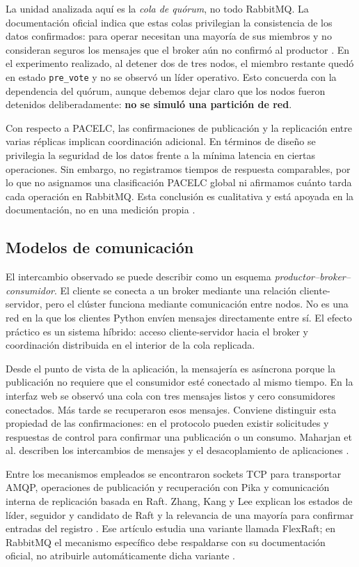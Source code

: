 \documentclass[12pt,a4paper]{article}
\begin{document}
La unidad analizada aquí es la \emph{cola de quórum}, no todo RabbitMQ. La documentación oficial indica que estas colas privilegian la consistencia de los datos confirmados: para operar necesitan una mayoría de sus miembros y no consideran seguros los mensajes que el broker aún no confirmó al productor \cite{RabbitMQQuorum2026}. En el experimento realizado, al detener dos de tres nodos, el miembro restante quedó en estado \texttt{pre\_vote} y no se observó un líder operativo. Esto concuerda con la dependencia del quórum, aunque debemos dejar claro que los nodos fueron detenidos deliberadamente: \textbf{no se simuló una partición de red}.

Con respecto a PACELC, las confirmaciones de publicación y la replicación entre varias réplicas implican coordinación adicional. En términos de diseño se privilegia la seguridad de los datos frente a la mínima latencia en ciertas operaciones. Sin embargo, no registramos tiempos de respuesta comparables, por lo que no asignamos una clasificación PACELC global ni afirmamos cuánto tarda cada operación en RabbitMQ. Esta conclusión es cualitativa y está apoyada en la documentación, no en una medición propia \cite{RabbitMQQuorum2026, Ahmed2023}.

\subsection{Modelos de comunicación}
El intercambio observado se puede describir como un esquema \emph{productor--broker--consumidor}. El cliente se conecta a un broker mediante una relación cliente-servidor, pero el clúster funciona mediante comunicación entre nodos. No es una red en la que los clientes Python envíen mensajes directamente entre sí. El efecto práctico es un sistema híbrido: acceso cliente-servidor hacia el broker y coordinación distribuida en el interior de la cola replicada.

Desde el punto de vista de la aplicación, la mensajería es asíncrona porque la publicación no requiere que el consumidor esté conectado al mismo tiempo. En la interfaz web se observó una cola con tres mensajes listos y cero consumidores conectados. Más tarde se recuperaron esos mensajes. Conviene distinguir esta propiedad de las confirmaciones: en el protocolo pueden existir solicitudes y respuestas de control para confirmar una publicación o un consumo. Maharjan et al. describen los intercambios de mensajes y el desacoplamiento de aplicaciones \cite{Maharjan2023}.

Entre los mecanismos empleados se encontraron sockets TCP para transportar AMQP, operaciones de publicación y recuperación con Pika y comunicación interna de replicación basada en Raft. Zhang, Kang y Lee explican los estados de líder, seguidor y candidato de Raft y la relevancia de una mayoría para confirmar entradas del registro \cite{Zhang2024FlexRaft}. Ese artículo estudia una variante llamada FlexRaft; en RabbitMQ el mecanismo específico debe respaldarse con su documentación oficial, no atribuirle automáticamente dicha variante \cite{RabbitMQQuorum2026}.
\end{document}
